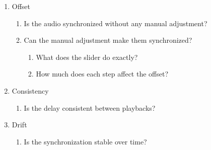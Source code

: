 \begin{enumerate}[label=(\alph*)]
    \item Offset
    \begin{enumerate}[label=(\arabic*)]
        \item Is the audio synchronized without any manual adjustment?
        \item Can the manual adjustment make them synchronized?
        \begin{enumerate}
            \item What does the slider do exactly?
            \item How much does each step affect the offset?
        \end{enumerate}
    \end{enumerate} 
    \item Consistency
    \begin{enumerate}[start=3,label=(\arabic*)]
        \item Is the delay consistent between playbacks?
    \end{enumerate}
    \item Drift
    \begin{enumerate}[start=6,label=(\arabic*)]
        \item Is the synchronization stable over time?
    \end{enumerate}
\end{enumerate}
